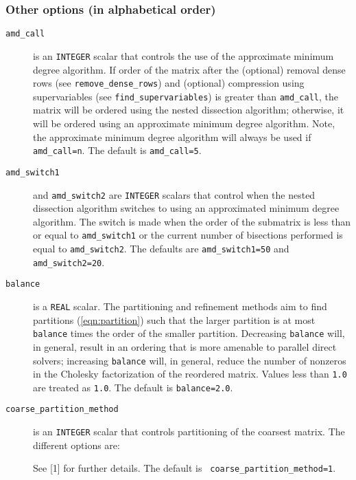 \subsubsection*{Other options (in alphabetical order)}

\begin{description}
\item[\texttt{amd\_call}] is an {\tt INTEGER} scalar that controls the use of 
the approximate minimum degree algorithm. If order of the matrix after the 
(optional) removal dense rows (see {\tt remove\_dense\_rows}) and (optional) 
compression using supervariables (see {\tt find\_supervariables}) is greater 
than {\tt amd\_call}, the matrix will be ordered using the nested dissection 
algorithm; otherwise, it will be ordered using an approximate minimum 
degree algorithm. Note, the approximate minimum degree algorithm will always be used if {\tt amd\_call=n}. The 
default is {\tt amd\_call=5}.

\item[\texttt{amd\_switch1}] and {\tt amd\_switch2} are {\tt INTEGER} scalars 
that control when the nested dissection algorithm switches to using an approximated minimum 
degree algorithm. The switch is made when the order of the submatrix is less 
than or equal to {\tt amd\_switch1} or the current number of 
bisections performed is equal to {\tt amd\_switch2}.  The 
defaults are {\tt amd\_switch1=50} and {\tt amd\_switch2=20}.

\item[\texttt{balance}] is a {\tt REAL} scalar. The partitioning and refinement
methods aim to find partitions (\ref{eqn:partition}) such that the larger 
partition is at most {\tt balance} times the order of the smaller partition. 
Decreasing {\tt balance} will, in
general, result in an ordering that is more amenable to
parallel direct solvers; increasing {\tt balance} will, in general, reduce the
number of nonzeros in the Cholesky factorization of the reordered matrix. 
Values less than {\tt 1.0} are treated as {\tt 1.0}. The
default is {\tt balance=2.0}.


\item[\texttt{coarse\_partition\_method}] is an {\tt INTEGER} scalar that 
controls partitioning of the coarsest matrix. The different options are:
See [1] for further details. The default is {\tt
coarse\_partition\_method=1}. 



\end{description}
